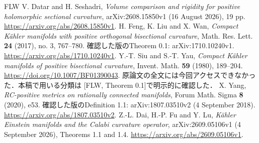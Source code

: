 \documentclass[12pt]{amsart}
\theoremstyle{definition}
\theoremstyle{remark}
\numberwithin{equation}{section}
\theoremstyle{plain}
\theoremstyle{remark}
\theoremstyle{definition}
\begin{document}
\begin{thebibliography}{FLW}
V. Datar and H. Seshadri,
\textit{Volume comparison and rigidity for positive holomorphic sectional curvature},
arXiv:2608.15850v1 (16 August 2026), 19 pp.
\url{https://arxiv.org/abs/2608.15850v1}.
H. Feng, K. Liu and X. Wan,
\textit{Compact K\"ahler manifolds with positive orthogonal bisectional curvature},
Math. Res. Lett. \textbf{24} (2017), no. 3, 767--780.
確認した版のTheorem 0.1: arXiv:1710.10240v1.
\url{https://arxiv.org/abs/1710.10240v1}.
Y.-T. Siu and S.-T. Yau,
\textit{Compact K\"ahler manifolds of positive bisectional curvature},
Invent. Math. \textbf{59} (1980), 189--204.
\url{https://doi.org/10.1007/BF01390043}.
原論文の全文には今回アクセスできなかった．本稿で用いる分類は
[FLW, Theorem 0.1]で明示的に確認した．
X. Yang,
\textit{RC-positive metrics on rationally connected manifolds},
Forum Math. Sigma \textbf{8} (2020), e53.
確認した版のDefinition 1.1: arXiv:1807.03510v2 (4 September 2018).
\url{https://arxiv.org/abs/1807.03510v2}.
Z.-L. Dai, H.-P. Fu and Y. Lu,
\textit{K\"ahler Einstein manifolds and the Calabi curvature operator},
arXiv:2609.05106v1 (4 September 2026), Theorems 1.1 and 1.4.
\url{https://arxiv.org/abs/2609.05106v1}.
\end{thebibliography}
\end{document}
